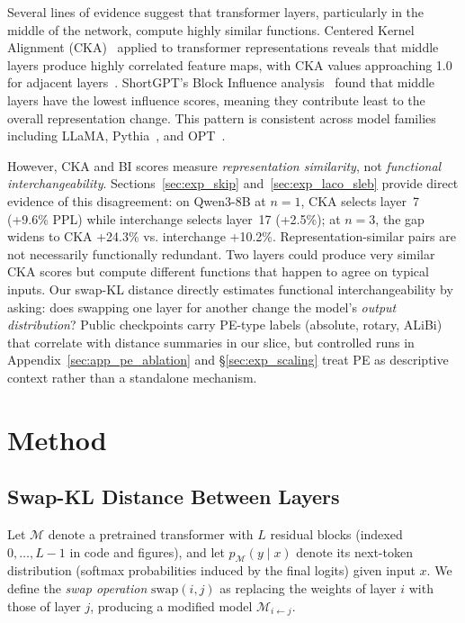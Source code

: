 \documentclass{article}
\begin{document}
Several lines of evidence suggest that transformer layers, particularly in the middle of the network, compute highly similar functions. Centered Kernel Alignment (CKA)~\citep{kornblith2019similarity} applied to transformer representations reveals that middle layers produce highly correlated feature maps, with CKA values approaching 1.0 for adjacent layers~\citep{raghu2021vision}. ShortGPT's Block Influence analysis~\citep{men2024shortgpt} found that middle layers have the lowest influence scores, meaning they contribute least to the overall representation change. This pattern is consistent across model families including LLaMA, Pythia~\citep{biderman2023pythia}, and OPT~\citep{zhang2022opt}.

However, CKA and BI scores measure \emph{representation similarity}, not \emph{functional interchangeability}. Sections~\ref{sec:exp_skip} and~\ref{sec:exp_laco_sleb} provide direct evidence of this disagreement: on Qwen3-8B at $n{=}1$, CKA selects layer~7 (+9.6\% PPL) while interchange selects layer~17 (+2.5\%); at $n{=}3$, the gap widens to CKA +24.3\% vs. interchange +10.2\%. Representation-similar pairs are not necessarily functionally redundant. Two layers could produce very similar CKA scores but compute different functions that happen to agree on typical inputs. Our swap-KL distance directly estimates functional interchangeability by asking: does swapping one layer for another change the model's \emph{output distribution}? Public checkpoints carry PE-type labels (absolute, rotary, ALiBi) that correlate with distance summaries in our slice, but controlled runs in Appendix~\ref{sec:app_pe_ablation} and \S\ref{sec:exp_scaling} treat PE as descriptive context rather than a standalone mechanism.

\section{Method}
\label{sec:method}

\subsection{Swap-KL Distance Between Layers}
\label{sec:method_distance}

Let $\mathcal{M}$ denote a pretrained transformer with $L$ residual blocks (indexed $0,\ldots,L{-}1$ in code and figures), and let $p_\mathcal{M}(y \mid x)$ denote its next-token distribution (softmax probabilities induced by the final logits) given input $x$. We define the \emph{swap operation} $\text{swap}(i, j)$ as replacing the weights of layer $i$ with those of layer $j$, producing a modified model $\mathcal{M}_{i \leftarrow j}$.
\end{document}
